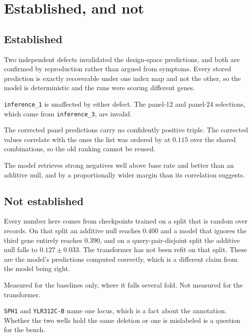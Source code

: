 
\section{Established, and not}
\label{sec:limits}

\subsection{Established}

Two independent defects invalidated the design-space predictions, and both are
confirmed by reproduction rather than argued from symptoms. Every stored
prediction is exactly recoverable under one index map and not the other, so the
model is deterministic and the runs were scoring different genes.

\texttt{inference\_1} is unaffected by either defect. The panel-12 and panel-24
selections, which came from \texttt{inference\_3}, are invalid.

The corrected panel predictions carry no confidently positive triple. The
corrected values correlate with the ones the list was ordered by at $0.115$ over
the shared combinations, so the old ranking cannot be reused.

The model retrieves strong negatives well above base rate and better than an
additive null, and by a proportionally wider margin than its correlation
suggests.

\subsection{Not established}

Every number here comes from checkpoints trained on a split that is random over
records. On that split an additive null reaches $0.400$ and a model that ignores
the third gene entirely reaches $0.390$, and on a query-pair-disjoint split the
additive null falls to $0.127 \pm 0.033$. The transformer has not been refit on
that split. These are the model's predictions computed correctly, which is a
different claim from the model being right.

Measured for the baselines only, where it falls several fold. Not measured for
the transformer.

\texttt{SPH1} and \texttt{YLR312C-B} name one locus, which is a fact about the
annotation. Whether the two wells hold the same deletion or one is mislabeled is
a question for the bench.

